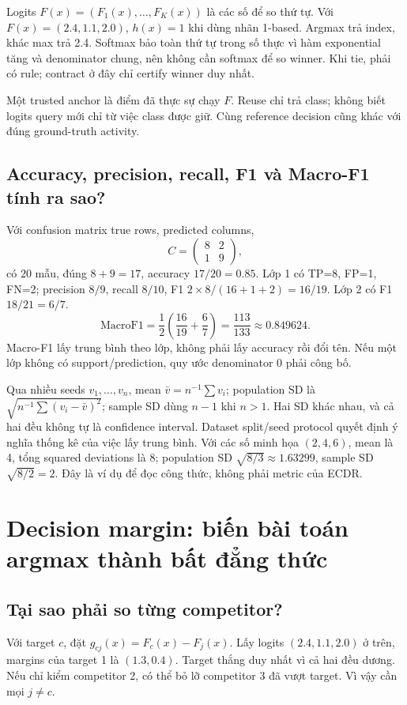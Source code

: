 \documentclass[11pt,a4paper]{article}
\theoremstyle{definition}
\begin{document}
Logits $F(x)=(F_1(x),\ldots,F_K(x))$ là các số để so thứ tự. Với
$F(x)=(2.4,1.1,2.0)$, $h(x)=1$ khi dùng nhãn 1-based. Argmax trả index,
khác max trả 2.4. Softmax bảo toàn thứ tự trong số thực vì hàm exponential
tăng và denominator chung, nên không cần softmax để so winner. Khi tie,
phải có rule; contract ở đây chỉ certify winner duy nhất.

Một trusted anchor là điểm đã thực sự chạy $F$. Reuse chỉ trả class; không
biết logits query mới chỉ từ việc class được giữ. Cùng reference decision
cũng khác với đúng ground-truth activity.

\subsection{Accuracy, precision, recall, F1 và Macro-F1 tính ra sao?}
Với confusion matrix true rows, predicted columns,
\begin{equation}
C=\begin{pmatrix}8&2\\1&9\end{pmatrix},
\end{equation}
có $20$ mẫu, đúng $8+9=17$, accuracy $17/20=0.85$. Lớp 1 có
TP=8, FP=1, FN=2; precision $8/9$, recall $8/10$, F1
$2\times8/(16+1+2)=16/19$. Lớp 2 có F1 $18/21=6/7$.
\begin{equation}
\mathrm{MacroF1}=\frac12\left(\frac{16}{19}+\frac67\right)
=\frac{113}{133}\approx0.849624.
\end{equation}
Macro-F1 lấy trung bình theo lớp, không phải lấy accuracy rồi đổi tên.
Nếu một lớp không có support/prediction, quy ước denominator 0 phải công bố.

Qua nhiều seeds $v_1,\ldots,v_n$, mean $\bar v=n^{-1}\sum v_i$; population
SD là $\sqrt{n^{-1}\sum(v_i-\bar v)^2}$; sample SD dùng $n-1$ khi $n>1$.
Hai SD khác nhau, và cả hai đều không tự là confidence interval. Dataset
split/seed protocol quyết định ý nghĩa thống kê của việc lấy trung bình.
Với các số minh họa $(2,4,6)$, mean là 4, tổng squared deviations là 8;
population SD $\sqrt{8/3}\approx1.63299$, sample SD $\sqrt{8/2}=2$.
Đây là ví dụ để đọc công thức, không phải metric của ECDR.

\section{Decision margin: biến bài toán argmax thành bất đẳng thức}
\subsection{Tại sao phải so từng competitor?}
Với target $c$, đặt $g_{cj}(x)=F_c(x)-F_j(x)$. Lấy logits
$(2.4,1.1,2.0)$ ở trên, margins của target 1 là $(1.3,0.4)$. Target thắng
duy nhất vì cả hai đều dương. Nếu chỉ kiểm competitor 2, có thể bỏ lỡ
competitor 3 đã vượt target. Vì vậy cần mọi $j\ne c$.
\end{document}
